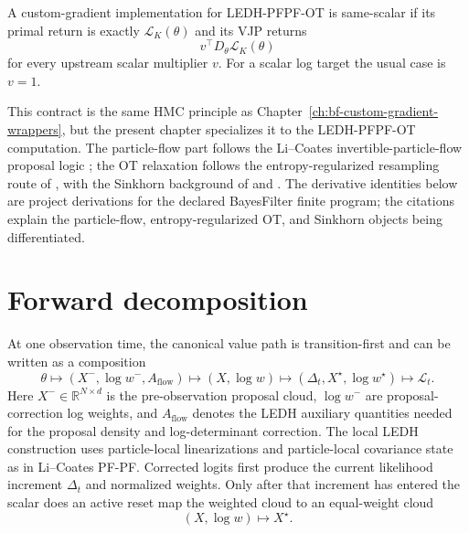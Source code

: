 \begin{definition}
\label{def:bf-ledh-ot-same-scalar}
A custom-gradient implementation for LEDH-PFPF-OT is same-scalar if its primal
return is exactly \(\mathcal L_K(\theta)\) and its VJP returns
\[
  v^\top D_\theta \mathcal L_K(\theta)
\]
for every upstream scalar multiplier \(v\).  For a scalar log target the usual
case is \(v=1\).
\end{definition}

This contract is the same HMC principle as Chapter~\ref{ch:bf-custom-gradient-wrappers},
but the present chapter specializes it to the LEDH-PFPF-OT computation.  The
particle-flow part follows the Li--Coates invertible-particle-flow proposal
logic \citep{li2017particle}; the OT relaxation follows the entropy-regularized
resampling route of \citet{corenflos2021differentiable}, with the Sinkhorn
background of \citet{cuturi2013sinkhorn} and
\citet{peyre2019computational}.
The derivative identities below are project derivations for the declared
BayesFilter finite program; the citations explain the particle-flow,
entropy-regularized OT, and Sinkhorn objects being differentiated.

\section{Forward decomposition}
\label{sec:bf-ledh-ot-forward-decomposition}

At one observation time, the canonical value path is transition-first and can
be written as a composition
\begin{equation}
\label{eq:bf-ledh-ot-forward-composition}
  \theta
  \longmapsto
  (X^-, \log w^-, A_{\mathrm{flow}})
  \longmapsto
  (X, \log w)
  \longmapsto
  (\Delta_t,X^\star,\log w^\star)
  \longmapsto
  \mathcal L_t .
\end{equation}
Here \(X^-\in\mathbb R^{N\times d}\) is the pre-observation proposal cloud,
\(\log w^-\) are proposal-correction log weights, and
\(A_{\mathrm{flow}}\) denotes the LEDH auxiliary quantities needed for the
proposal density and log-determinant correction.  The local LEDH construction
uses particle-local linearizations and particle-local covariance state as in
Li--Coates PF-PF.  Corrected logits first produce the current likelihood
increment \(\Delta_t\) and normalized weights.  Only after that increment has
entered the scalar does an active reset map the weighted cloud to an
equal-weight cloud
\[
  (X,\log w) \longmapsto X^\star.
\]

